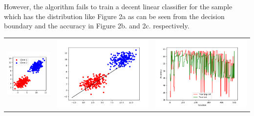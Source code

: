 \documentclass{article}
\begin{document}
However, the algorithm fails to train a decent linear classifier for the sample which has the distribution like Figure 2a as can be seen from the decision boundary and the accuracy in Figure 2b. and 2c. respectively.
\begin{center}
\begin{tabular}{ccc}
\includegraphics[scale=0.3]{scatter_sample2} &
\includegraphics[scale=0.2]{sample2_decision_doundary} &
\includegraphics[scale=0.2]{learning_curve_sample2} \\

\end{tabular}
\end{center}
\end{document}
